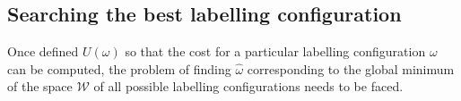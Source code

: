 \subsection{Searching the best labelling configuration} \label{sec:method:min}
Once defined $U(\omega)$ so that the cost for a particular labelling configuration $\omega$ can be computed, the problem of finding $\hat{\omega}$ corresponding to the global minimum of the space $\mathcal{W}$ of all possible labelling configurations needs to be faced. 
%
%
%


